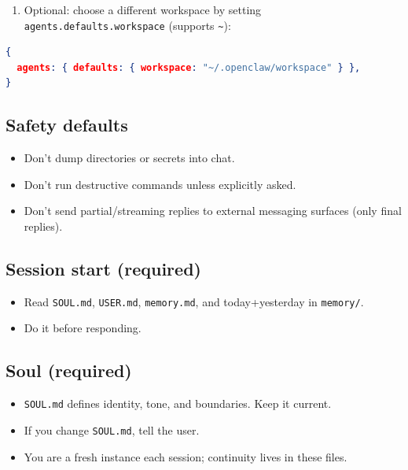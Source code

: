 \begin{enumerate}
  \item Optional: choose a different workspace by setting \texttt{agents.defaults.workspace} (supports \texttt{\textasciitilde{}}):
\end{enumerate}


\begin{lstlisting}[language=json]
{
  agents: { defaults: { workspace: "~/.openclaw/workspace" } },
}
\end{lstlisting}


\subsection{Safety defaults}


\begin{itemize}
  \item Don’t dump directories or secrets into chat.
  \item Don’t run destructive commands unless explicitly asked.
  \item Don’t send partial/streaming replies to external messaging surfaces (only final replies).
\end{itemize}


\subsection{Session start (required)}


\begin{itemize}
  \item Read \texttt{SOUL.md}, \texttt{USER.md}, \texttt{memory.md}, and today+yesterday in \texttt{memory/}.
  \item Do it before responding.
\end{itemize}


\subsection{Soul (required)}


\begin{itemize}
  \item \texttt{SOUL.md} defines identity, tone, and boundaries. Keep it current.
  \item If you change \texttt{SOUL.md}, tell the user.
  \item You are a fresh instance each session; continuity lives in these files.
\end{itemize}


